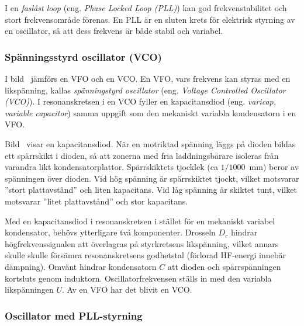 I en \emph{faslåst loop} (eng. \emph{Phase Locked Loop (PLL)}) kan god
frekvenstabilitet och stort frekvensområde förenas.
En PLL är en sluten krets för elektrisk styrning av en oscillator, så att dess
frekvens är både stabil och variabel.

\subsubsection{Spänningsstyrd oscillator (VCO)}

I bild~ jämförs en VFO och en VCO.
En VFO, vars frekvens kan styras med en likspänning, kallas
\emph{spänningstyrd oscillator} (eng. \emph{Voltage Controlled Oscillator
  (VCO)}).
I resonanskretsen i en VCO fyller en kapacitansdiod (eng. \emph{varicap, variable
capacitor}) samma uppgift som den mekaniskt variabla kondensatorn i en VFO.

\newpage
{}

Bild~ visar en kapacitansdiod.
När en motriktad spänning läggs på dioden bildas ett spärrskikt i dioden,
så att zonerna med fria laddningsbärare isoleras från varandra likt
kondensatorplattor.
Spärrskiktets tjocklek (ca $1/1000$~\unit{\milli\metre}) beror av spänningen över
dioden.
Vid hög spänning är spärrskiktet tjockt, vilket motsvarar
''stort plattavstånd'' och liten kapacitans.
Vid låg spänning är skiktet tunt, vilket motsvarar ''litet plattavstånd'' och
stor kapacitans.

Med en kapacitansdiod i resonanskretsen i stället för en mekaniskt
variabel kondensator, behövs ytterligare två komponenter.
Drosseln \(D_r\) hindrar högfrekvenssignalen att överlagras på styrkretsens
likspänning, vilket annars skulle skulle försämra resonanskretsens godhetstal
(förlorad HF-energi innebär dämpning).
Omvänt hindrar kondensatorn \(C\) att dioden och spärrspänningen kortsluts
genom induktorn.
Oscillatorfrekvensen ställs in med den variabla likspänningen \(U\).
Av en VFO har det blivit en VCO.

\subsubsection{Oscillator med PLL-styrning}

